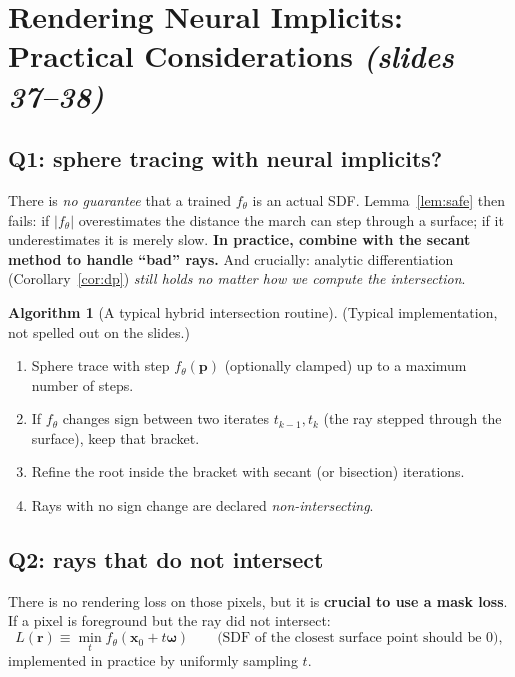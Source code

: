\documentclass[11pt,a4paper]{article}
\newcommand{\bx}{\bm{x}}
\newcommand{\bp}{{\bm{p}}}
\newcommand{\bom}{{\bm{\omega}}}
\newcommand{\br}{{\bm{r}}}
\theoremstyle{definition}
\newtheorem{algorithm}{Algorithm}[section]
\theoremstyle{plain}
\theoremstyle{remark}
\begin{document}

\section{Rendering Neural Implicits: Practical Considerations \emph{(slides 37--38)}}
\subsection*{Q1: sphere tracing with neural implicits?}
There is \emph{no guarantee} that a trained $f_\theta$ is an actual SDF. Lemma~\ref{lem:safe} then fails: if $|f_\theta|$
overestimates the distance the march can step through a surface; if it underestimates it is merely slow.
\textbf{In practice, combine with the secant method to handle ``bad'' rays.}
And crucially: analytic differentiation (Corollary~\ref{cor:dp}) \emph{still holds no matter how we compute the intersection}.

\begin{algorithm}[A typical hybrid intersection routine]\label{alg:hybrid}
(Typical implementation, not spelled out on the slides.)
\begin{enumerate}[nosep]
\item Sphere trace with step $f_\theta(\bp)$ (optionally clamped) up to a maximum number of steps.
\item If $f_\theta$ changes sign between two iterates $t_{k-1},t_k$ (the ray stepped through the surface), keep that bracket.
\item Refine the root inside the bracket with secant (or bisection) iterations.
\item Rays with no sign change are declared \emph{non-intersecting}.
\end{enumerate}
\end{algorithm}

\subsection*{Q2: rays that do not intersect}
There is no rendering loss on those pixels, but it is \textbf{crucial to use a mask loss}. If a pixel is foreground but
the ray did not intersect:
\[
L(\br)\equiv\min_t f_\theta(\bx_0+t\bom)\qquad\text{(SDF of the closest surface point should be $0$)},
\]
implemented in practice by uniformly sampling $t$.
\end{document}
